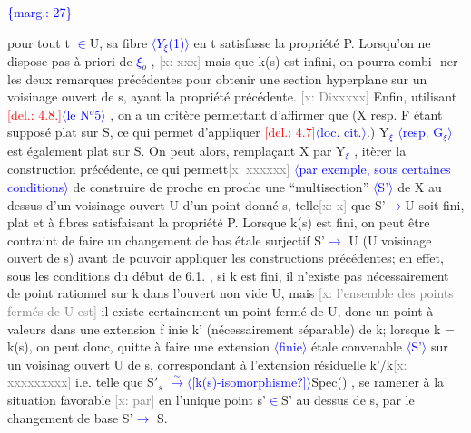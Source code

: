 \documentclass[11pt]{article}
\newcommand{\scanpage}[1]{\par\bigskip\noindent{\small\sffamily[scan #1]}\par}
\newcommand{\mspage}[1]{{\small\sffamily[p.\,#1]}}
\newcommand{\hand}[1]{\textcolor{blue}{#1}}
\let\over\relax
\newcommand{\over}[2]{\textcolor{gray}{#1}\textcolor{blue}{\ensuremath{^{\!\nearrow}}#2}}
\newcommand{\inserted}[2][]{\textcolor{blue}{$\langle$#2$\rangle$}}
\newcommand{\margin}[1]{\textcolor{blue}{\{\textsf{marg.:} #1\}}}
\newcommand{\deleted}[1]{\textcolor{red}{[\textsf{del.:} #1]}}
\newcommand{\xout}[1]{\textcolor{gray}{[\textsf{x:} #1]}}
\newcommand{\unsure}[1]{[#1?]}
\begin{document}
\margin{27}

\clearpage
\scanpage{25/28}
\mspage{29}
pour tout t \hand{$\in$}U,  sa fibre \inserted{$Y_{\xi}$(1)} en  t satisfasse la propriété P.  Lorsqu'on ne
dispose pas à priori de \hand{$\xi$}$_{o}$ , \xout{xxx} mais que k(s) est infini, on pourra combi-%
ner les deux remarques précédentes pour obtenir une section hyperplane
sur un voisinage ouvert de s, ayant la propriété précédente. \xout{Dixxxxx} Enfin,
utilisant \deleted{4.8.}\inserted{le N$^{o}$5} , on a un critère permettant d'affirmer que (X resp. F étant
supposé plat sur S, ce qui permet d'appliquer \deleted{4.7}\inserted{loc. cit.}.)  Y\hand{$_{\xi}$} \inserted[typed]{resp. G\hand{$_{\xi}$}} est également
plat sur S. On peut alors, remplaçant X par Y\hand{$_{\xi}$} , itèrer la construction
précédente, ce qui permett\xout{xxxxxx} \inserted[typed]{par exemple\hand{,} sous certaines conditions} de construire de proche en proche une
``multisection'' \inserted[typed]{S'} de X au dessus d'un voisinage ouvert U d'un point donné s,
telle\xout{x} que S'\hand{$\longrightarrow$}U soit fini, plat et à fibres satisfaisant la propriété P.
Lorsque k(s) est fini, on peut être contraint de faire un changement de bas%
étale surjectif S'\hand{$\longrightarrow$} U (U voisinage ouvert de s) avant de pouvoir appliquer
les constructions précédentes; en effet, sous les conditions du début de
6.1. , si k est fini, il n'existe pas nécessairement de point rationnel sur
k dans  l'ouvert non vide U, mais \xout{l'ensemble des points fermés de U est}
il existe certainement un point fermé de U, donc un point à valeurs dans
une extension f inie k' (nécessairement séparable) de k; lorsque k = k(s),
on peut donc, quitte à faire une extension \inserted[typed]{finie} étale convenable \inserted[typed]{S'} sur un voisinag%
ouvert U de  s, correspondant à l'extension résiduelle k'/k\xout{xxxxxxxxx}
i.e. telle que  S$'_{s}$ \hand{$\xrightarrow{\sim}$}\inserted{\unsure{k(s)-isomorphisme}}Spec(\over{k}{k'}) , se ramener à la situation favorable \xout{par}
en l'unique point s'\hand{$\in$}S' au dessus de s, par le changement de base S'\hand{$\to$} S.
\end{document}
